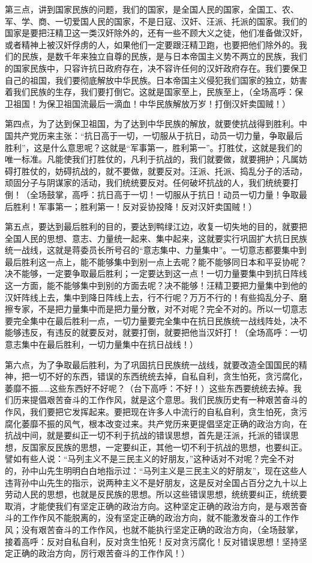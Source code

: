 第三点，讲到国家民族的问题，我们的国家，是全国人民的国家，全国工、农、军、学、商、一切爱国人民的国家，不是日寇、汉奸、汪派、托派的国家。我们的国家是要把汪精卫这一类汉奸除外的，还有一些不顾大义之徒，他们准备做汉奸，或者精神上被汉奸俘虏的人，如果他们一定要跟汪精卫跑，也要把他们除外的。我们的民族，是数千年来独立自尊的民族，是与日本帝国主义势不两立的民族，我们的国家民族中，只容许抗日政府存在，决不容许任何的汉奸政府存在。我们要保卫自己的祖国，我们要彻底解放中华民族。日本帝国主义侵犯我们国家的独立，妨害着我们民族的生存，我们要打倒它。这就是国家至上，民族至上，（全场高呼：保卫祖国！为保卫祖国流最后一滴血！中华民族解放万岁！打倒汉奸卖国贼！）

第四点，为了达到保卫祖国，为了达到中华民族的解放，就要使抗战得到胜利。中国共产党历来主张：“抗日高于一切，一切服从于抗日，动员一切力量，争取最后胜利”，这是什么意思呢？这就是“军事第一，胜利第一”。打胜仗，这就是我们的唯一标准。凡能使我们打胜仗的，凡利于抗战的，我们就要做，就要拥护；凡属妨碍打胜仗的，妨碍抗战的，就不要做，就要反对。汪派、托派、捣乱分子的活动，顽固分子与阴谋家的活动，我们统统要反对。任何破坏抗战的人，我们统统要打倒！（全场鼓掌，高呼：抗日高于一切！一切服从于抗日！动员一切力量！争取最后胜利！军事第一；胜利第一！反对妥协投降！反对汉奸卖国贼！）

第五点，要达到最后胜利的目的，要达到鸭绿江边，收复一切失地的目的，就要把全国人民的思想、意志、力量统一起来、集中起来，这就要实行巩固扩大抗日民族统一战线，这就是蒋委员长所号召的“意志集中、力量集中”。一切意志都要集中到最后胜利这一点上，能不能够集中到别一点上去呢？能不能够同日本和平妥协呢？决不能够，一定要争取最后胜利；一定要达到这一点！一切力量要集中到抗日阵线这一方面，能不能够集中到别的方面去呢？决不能够！汪精卫要把力量集中到他的汉奸阵线上去，集中到降日阵线上去，行不行呢？万万不行的！有些捣乱分子、磨擦专家，不是把力量集中而是把力量分散，对不对呢？完全不对的。所以一切意志要完全集中在最后胜利一点，一切力量要完全集中在抗日民族统一战线阵处，决不能够违反，有违反的就要反对，就要打倒，就要把他当汉奸打！（全场高呼：一切意志集中在最后胜利，一切力量集中在抗日战线！）

第六点，为了争取最后胜利，为了巩固抗日民族统一战线，就要改造全国国民的精神，把一切不好的东西，错误的东西统统去掉，自私自利，贪生怕死，贪污腐化，萎靡不振……这些东西好不好呢？（台下高呼：不好！）这些东西要统统去掉。我们历来提倡艰苦奋斗的工作作风，就是这个意思。我们民族历史有一种艰苦奋斗的作风，我们要把它发挥起来。要把现在许多人中流行的自私自利，贪生怕死，贪污腐化萎靡不振的风气，根本改变过来。共产党历来更提倡坚定正确的政治方向，在抗战中间，就是要纠正一切不利于抗战的错误思想，首先是汪派，托派的错误思想，反国家反民族的思想，一定要纠正，其他一切不利于抗战的思想，也要纠正。譬如有些人说：“马列主义不是三民主义的好朋友，”这种话对不对呢？完全不对的，孙中山先生明明白白地指示过：“马列主义是三民主义的好朋友”，现在这些人违背孙中山先生的指示，说两种主义不是好朋友，这是反对全国占百分之九十以上劳动人民的思想，也就是反民族的思想。所以这些错误思想，统统要纠正，统统要取消，才能使我们有坚定正确的政治方向。这种坚定正确的政治方向，是与艰苦奋斗的工作作风不能脱离的，没有坚定正确的政治方向，就不能激发奋斗的工作作风；没有艰苦奋斗的工作作风，也就不能执行坚定正确的政治方向，（全场鼓掌，接着高呼：反对自私自利，反对贪生怕死！反对贪污腐化！反对错误思想！坚持坚定正确的政治方向，厉行艰苦奋斗的工作作风！）

